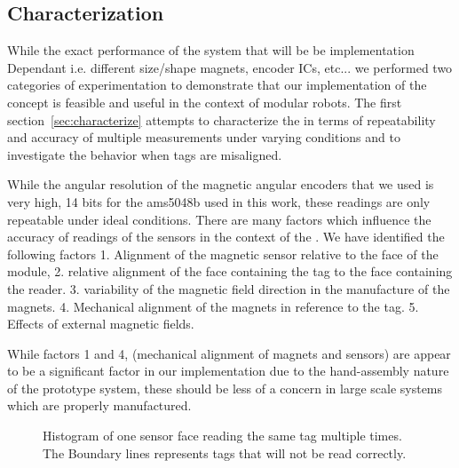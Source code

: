 \subsection{\tagNamePlural Characterization}
\label{sec:tagsCharacterize}

While the exact performance of the \tagName system that will be be implementation Dependant i.e. different size/shape magnets, encoder ICs, etc... we performed two categories of experimentation to demonstrate that our implementation of the \tagName concept is feasible and useful in the context of modular robots. The first section~\ref{sec:characterize} attempts to characterize the \tagNamePlural in terms of repeatability and accuracy of multiple measurements under varying conditions and to investigate the behavior when tags are misaligned. 

While the angular resolution of the magnetic angular encoders that we used is very high, 14 bits for the ams5048b used in this work, these readings are only repeatable under ideal conditions. There are many factors which influence the accuracy of readings of the sensors in the context of the \tagNamePlural. We have identified the following factors 1. Alignment of the magnetic sensor relative to the face of the module, 2. relative alignment of the face containing the tag to the face containing the reader. 3. variability of the magnetic field direction in the manufacture of the magnets. 4. Mechanical alignment of the magnets in reference to the tag. 5. Effects of external magnetic fields.

While factors 1 and 4, (mechanical alignment of magnets and sensors) are appear to be a significant factor in our implementation due to the hand-assembly nature of the prototype system, these should be less of a concern in large scale systems which are properly manufactured.

\begin{figure}[h]
	
	\caption{Histogram of one sensor face reading the same tag multiple times. The Boundary lines represents tags that will not be read correctly.}
	\label{fig:histogram}
\end{figure}


